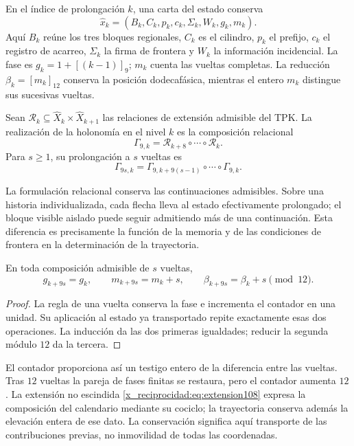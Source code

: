 En el índice de prolongación \(k\), una carta del estado conserva
\[
 \widehat x_k=(B_k,C_k,p_k,c_k,\Sigma_k,W_k,g_k,m_k).
\]
Aquí \(B_k\) reúne los tres bloques regionales, \(C_k\) es el cilindro,
\(p_k\) el prefijo, \(c_k\) el registro de acarreo, \(\Sigma_k\) la firma
de frontera y \(W_k\) la información incidencial. La fase es
\(g_k=1+[(k-1)]_9\); \(m_k\) cuenta las vueltas completas. La reducción
\(\beta_k=[m_k]_{12}\) conserva la posición dodecafásica, mientras el
entero \(m_k\) distingue sus sucesivas vueltas.

\begin{definition}
\label{x_reciprocidad:mono-ampl:def-vuelta}
Sean \(\mathcal R_k\subseteq\widehat X_k\times\widehat X_{k+1}\)
las relaciones de extensión admisible del TPK. La realización de la
holonomía en el nivel \(k\) es la composición relacional
\[
 \Gamma_{9,k}=\mathcal R_{k+8}\circ\cdots\circ\mathcal R_k.
\]
Para \(s\geq1\), su prolongación a \(s\) vueltas es
\[
 \Gamma_{9s,k}=
 \Gamma_{9,k+9(s-1)}\circ\cdots\circ\Gamma_{9,k}.
\]
\end{definition}

La formulación relacional conserva las continuaciones admisibles. Sobre
una historia individualizada, cada flecha lleva al estado efectivamente
prolongado; el bloque visible aislado puede seguir admitiendo más de una
continuación. Esta diferencia es precisamente la función de la memoria y
de las condiciones de frontera en la determinación de la trayectoria.

\begin{proposition}
\label{x_reciprocidad:mono-ampl:vueltas}
En toda composición admisible de \(s\) vueltas,
\[
 g_{k+9s}=g_k,\qquad m_{k+9s}=m_k+s,\qquad
 \beta_{k+9s}=\beta_k+s\pmod{12}.
\]
\end{proposition}
\begin{proof}
La regla de una vuelta conserva la fase e incrementa el contador en una
unidad. Su aplicación al estado ya transportado repite exactamente esas
dos operaciones. La inducción da las dos primeras igualdades; reducir la
segunda módulo \(12\) da la tercera.
\end{proof}

El contador proporciona así un testigo entero de la diferencia entre las
vueltas. Tras \(12\) vueltas la pareja de fases finitas se restaura, pero
el contador aumenta \(12\). La extensión no escindida
\eqref{x_reciprocidad:eq:extension108} expresa la composición del calendario mediante su
cociclo; la trayectoria conserva además la elevación entera de ese dato.
La conservación significa aquí transporte de las contribuciones previas,
no inmovilidad de todas las coordenadas.

